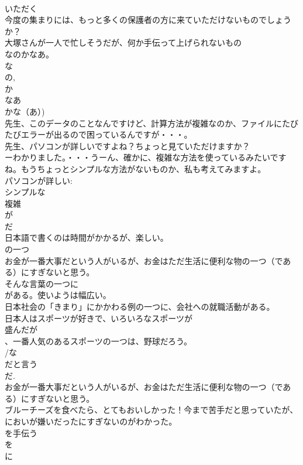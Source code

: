 \documentclass[8pt]{extreport}
\begin{document}
\begin{CJK}{UTF8}{min}
\\	いただく 
\\	今度の集まりには、もっと多くの保護者の方に来ていただけないものでしょうか？
\\	大塚さんが一人で忙しそうだが、何か手伝って上げられないもの
\\	なのかなあ。
\\	な 
\\	の, 
\\	か 
\\	なあ 
\\	かな（あ）)
\\	先生、このデータのことなんですけど、計算方法が複雑なのか、ファイルにたびたびエラーが出るので困っているんですが・・・。
\\	先生、パソコンが詳しいですよね？ちょっと見ていただけますか？
\\	ーわかりました。・・・うーん、確かに、複雑な方法を使っているみたいですね。もうちょっとシンプルな方法がないものか、私も考えてみますよ。
\\	パソコンが詳しい: 
\\	シンプルな
\\	複雑	
\\	が
\\	だ 
\\	日本語で書くのは時間がかかるが、楽しい。	
\\	の一つ 
\\	お金が一番大事だという人がいるが、お金はただ生活に便利な物の一つ（である）にすぎないと思う。
\\	そんな言葉の一つに
\\	がある。使いようは幅広い。
\\	日本社会の「きまり」にかかわる例の一つに、会社への就職活動がある。
\\	日本人はスポーツが好きで、いろいろなスポーツが
\\	盛んだが
\\	、一番人気のあるスポーツの一つは、野球だろう。	
\\	/な
\\	だと言う
\\	だ.　
\\	お金が一番大事だという人がいるが、お金はただ生活に便利な物の一つ（である）にすぎないと思う。
\\	ブルーチーズを食べたら、とてもおいしかった！今まで苦手だと思っていたが、においが嫌いだったにすぎないのがわかった。
\\	を手伝う
\\	を 
\\	に

\end{CJK}
\end{document}
